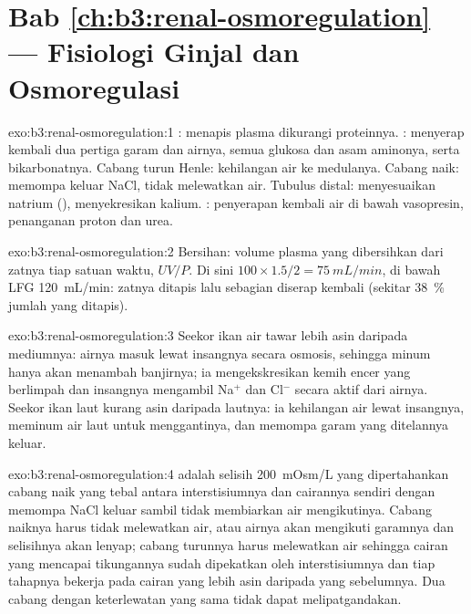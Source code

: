 \section*{Bab \ref{ch:b3:renal-osmoregulation} --- Fisiologi Ginjal dan Osmoregulasi}

\begin{solution}{exo:b3:renal-osmoregulation:1}
: menapis plasma dikurangi proteinnya. : menyerap kembali
dua pertiga garam dan airnya, semua glukosa dan asam aminonya,
serta bikarbonatnya. Cabang turun Henle: kehilangan air ke medulanya.
Cabang naik: memompa keluar NaCl, tidak melewatkan air. Tubulus distal:
menyesuaikan natrium (), menyekresikan kalium. :
penyerapan kembali air di bawah vasopresin, penanganan proton dan urea.
\end{solution}

\begin{solution}{exo:b3:renal-osmoregulation:2}
Bersihan: volume plasma yang dibersihkan dari zatnya tiap satuan
waktu, $UV/P$. Di sini $100\times 1.5/2 = \qty{75}{mL/min}$, di bawah LFG
\qty{120}{mL/min}: zatnya ditapis lalu sebagian diserap kembali
(sekitar \qty{38}{\%} jumlah yang ditapis).
\end{solution}

\begin{solution}{exo:b3:renal-osmoregulation:3}
Seekor ikan air tawar lebih asin daripada mediumnya: airnya masuk lewat
insangnya secara osmosis, sehingga minum hanya akan menambah banjirnya; ia
mengekskresikan kemih encer yang berlimpah dan  insangnya mengambil
Na$^{+}$ dan Cl$^{-}$ secara aktif dari airnya. Seekor ikan laut kurang
asin daripada lautnya: ia kehilangan air lewat insangnya, meminum air laut
untuk menggantinya, dan  memompa garam yang ditelannya keluar.
\end{solution}

\begin{solution}{exo:b3:renal-osmoregulation:4}
 adalah selisih \qty{200}{mOsm/L} yang dipertahankan cabang
naik yang tebal antara interstisiumnya dan cairannya sendiri
dengan memompa NaCl keluar sambil tidak membiarkan air mengikutinya. Cabang naiknya
harus tidak melewatkan air, atau airnya akan mengikuti garamnya dan
selisihnya akan lenyap; cabang turunnya harus melewatkan air sehingga
cairan yang mencapai tikungannya sudah dipekatkan oleh
interstisiumnya dan tiap tahapnya bekerja pada cairan yang lebih asin daripada yang sebelumnya. Dua
cabang dengan keterlewatan yang sama tidak dapat melipatgandakan.
\end{solution}

